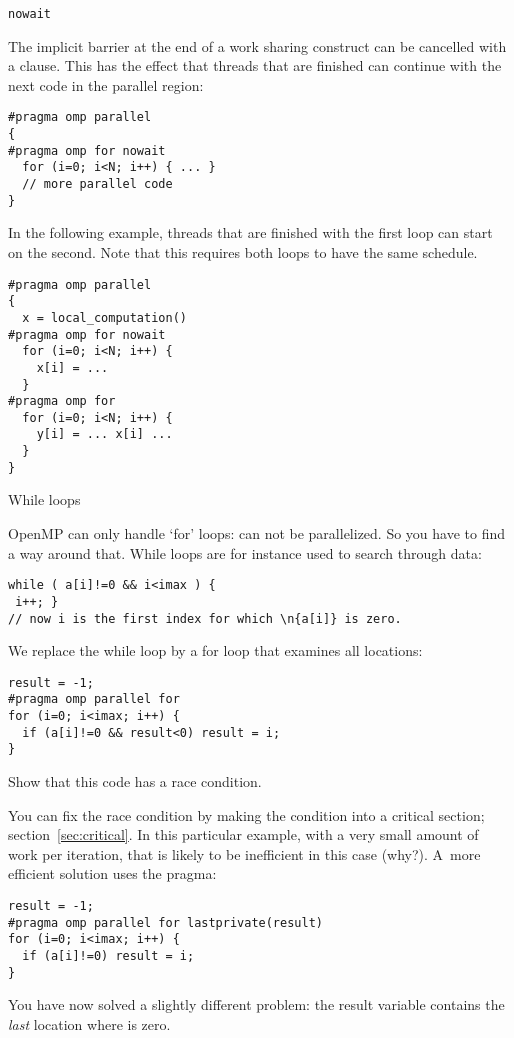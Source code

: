  {\texttt{nowait}}

The implicit barrier at the end of a work sharing construct
can be cancelled with a  clause.
This has the effect that threads that are finished can continue
with the next code in the parallel region:
\begin{verbatim}
#pragma omp parallel
{
#pragma omp for nowait
  for (i=0; i<N; i++) { ... }
  // more parallel code
}
\end{verbatim}

In the following example, threads that are finished with the first loop
can start on the second. Note that this requires both loops to have
the same schedule.
\begin{verbatim}
#pragma omp parallel
{
  x = local_computation()
#pragma omp for nowait
  for (i=0; i<N; i++) { 
    x[i] = ... 
  }
#pragma omp for 
  for (i=0; i<N; i++) { 
    y[i] = ... x[i] ...
  }
}
\end{verbatim}

 {While loops}

OpenMP can only handle `for' loops:  can not
be parallelized. So you have to find a way around that. While loops
are for instance used to search through data:
\begin{verbatim}
while ( a[i]!=0 && i<imax ) {
 i++; }
// now i is the first index for which \n{a[i]} is zero.
\end{verbatim}
We replace the while loop by a for loop that examines all locations:
\begin{verbatim}
result = -1;
#pragma omp parallel for
for (i=0; i<imax; i++) {
  if (a[i]!=0 && result<0) result = i;
}
\end{verbatim}
\begin{exercise}
  Show that this code has a race condition.
\end{exercise}
You can fix the race condition by making the condition into a critical section;
section~\ref{sec:critical}. In this particular example, with a very small amount
of work per iteration, that is likely to be inefficient 
in this case (why?).
A~more efficient solution uses the  pragma:
\begin{verbatim}
result = -1;
#pragma omp parallel for lastprivate(result)
for (i=0; i<imax; i++) {
  if (a[i]!=0) result = i;
}
\end{verbatim}
You have now solved a slightly different problem: the result variable
contains the \emph{last} location where  is zero.

